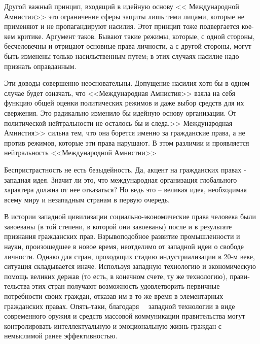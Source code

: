 \documentclass{book}
\begin{document}
Другой важный принцип, входящий в идейную основу << Меж­дународной Амнистии>> это ограничение сферы защиты лишь теми лицами, которые не применяют и не пропагандируют на­силия. Этот принцип тоже подвергается кое-кем критике. Ар­гумент таков. Бывают такие режимы, которые, с одной сторо­ны, бесчеловечны и отрицают основные права личности, а с другой стороны, могут быть изменены только насильственным путем; в этих случаях насилие надо признать оправданным.

Эти доводы совершенно неосновательны. Допущение насилия хотя бы в одном случае будет означать, что <<Международная Амнистия>> взяла на себя функцию общей оценки политических режимов и даже выбор средств для их свержения. Это ради­кально изменило бы идейную основу организации. От полити­ческой нейтральности не осталось бы и следа.>> Международная Амнистия>> сильна тем, что она борется именно за гражданские права,  а не против режимов,  которые эти права нарушают. В этом различии и проявляется нейтральность <<Международной Амнистии>>

Беспристрастность не есть безыдейность. Да, акцент на граж­данских правах - западная идея. Значит ли это, что междуна­родная организация глобального характера должна от нее отка­заться? Но ведь это -- великая идея, необходимая всему миру и незападным странам в первую очередь.

В истории западной цивилизации социально-экономические права человека были завоеваны (в той степени, в которой они завоеваны) после и в результате признания гражданских прав. Взрывоподобное развитие промышленности и науки, произо­шедшее в новое время, неотделимо от западной идеи о сво­боде личности. Однако для стран, проходящих стадию инду­стриализации в 20-м веке, ситуация складывается иначе. Исполь­зуя западную технологию и экономическую помощь великих держав (то есть, в конечном счете, ту же технологию), прави­тельства этих стран получают возможность удовлетворить первичные потребности своих граждан, отказав им в то же время в элементарных гражданских правах. Опять-таки, благо­даря   западной технологии в виде современного оружия и средств массовой коммуникации правительства могут кон­тролировать интеллектуальную и эмоциональную жизнь граж­дан с немыслимой ранее эффективностью.
\end{document}
